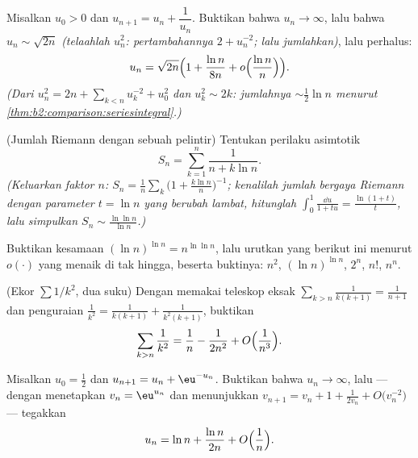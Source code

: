 \begin{exercise}[$\star\star\star$]\label{exo:b2:comparison:8}
Misalkan $u_0 > 0$ dan $u_{n+1} = u_n + \dfrac{1}{u_n}$. Buktikan bahwa
$u_n \to \infty$, lalu bahwa $u_n \sim \sqrt{2n}$ \emph{(telaahlah
$u_n^2$: pertambahannya $2 + u_n^{-2}$; lalu jumlahkan)}, lalu perhalus:
\[
u_n = \sqrt{2n}\Bigl(1 + \frac{\ln n}{8n} +
o\Bigl(\frac{\ln n}{n}\Bigr)\Bigr).
\]
\emph{(Dari $u_n^2 = 2n + \sum_{k<n} u_k^{-2} + u_0^2$ dan $u_k^2
\sim 2k$: jumlahnya $\sim \frac12\ln n$ menurut
\cref{thm:b2:comparison:seriesintegral}.)}
\end{exercise}

\begin{exercise}[$\star\star\star$]\label{exo:b2:comparison:9}
(Jumlah Riemann dengan sebuah pelintir) Tentukan perilaku asimtotik
\[
S_n = \sum_{k=1}^{n} \frac{1}{n + k\ln n} .
\]
\emph{(Keluarkan faktor $n$: $S_n = \frac1n\sum_k \bigl(1 +
\frac{k\ln n}{n}\bigr)^{-1}$; kenalilah jumlah bergaya Riemann dengan
parameter $t = \ln n$ yang berubah lambat, hitunglah $\int_0^1
\frac{\dd u}{1 + tu} = \frac{\ln(1+t)}{t}$, lalu simpulkan $S_n \sim
\frac{\ln\ln n}{\ln n}$.)}
\end{exercise}

\begin{exercise}[$\star$]\label{exo:b2:comparison:10}
Buktikan kesamaan $(\ln n)^{\ln n} = n^{\ln\ln n}$, lalu urutkan
yang berikut ini menurut $o(\cdot)$ yang menaik di tak hingga, beserta
buktinya: $n^2$, $(\ln n)^{\ln n}$, $2^n$, $n!$, $n^n$.
\end{exercise}

\begin{exercise}[$\star\star$]\label{exo:b2:comparison:11}
(Ekor $\sum 1/k^2$, dua suku) Dengan memakai teleskop eksak
$\sum_{k > n} \frac{1}{k(k+1)} = \frac{1}{n+1}$ dan penguraian
$\frac1{k^2} = \frac{1}{k(k+1)} + \frac{1}{k^2(k+1)}$, buktikan
\[
\sum_{k > n} \frac{1}{k^2}
= \frac1n - \frac{1}{2n^2} + O\Bigl(\frac{1}{n^3}\Bigr).
\]
\end{exercise}

\begin{exercise}[$\star\star\star$]\label{exo:b2:comparison:12}
Misalkan $u_0 = \frac12$ dan $u_{n+1} = u_n + \eu^{-u_n}$. Buktikan bahwa
$u_n \to \infty$, lalu --- dengan menetapkan $v_n = \eu^{u_n}$ dan
menunjukkan $v_{n+1} = v_n + 1 + \frac{1}{2v_n} + O\bigl(v_n^{-2}\bigr)$
--- tegakkan
\[
u_n = \ln n + \frac{\ln n}{2n} + O\Bigl(\frac1n\Bigr).
\]
\end{exercise}


